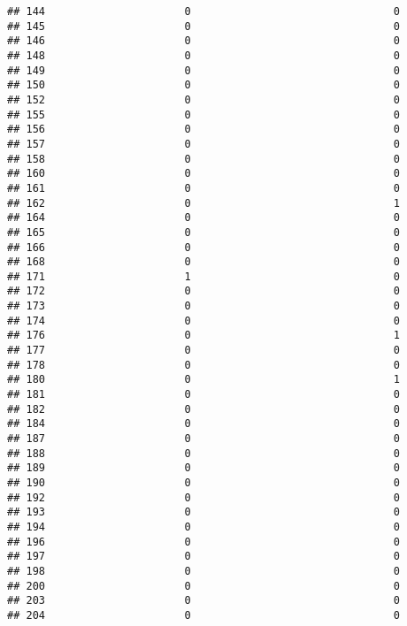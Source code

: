 \documentclass[
]{article}
\begin{document}
\begin{verbatim}
## 144                      0                                0
## 145                      0                                0
## 146                      0                                0
## 148                      0                                0
## 149                      0                                0
## 150                      0                                0
## 152                      0                                0
## 155                      0                                0
## 156                      0                                0
## 157                      0                                0
## 158                      0                                0
## 160                      0                                0
## 161                      0                                0
## 162                      0                                1
## 164                      0                                0
## 165                      0                                0
## 166                      0                                0
## 168                      0                                0
## 171                      1                                0
## 172                      0                                0
## 173                      0                                0
## 174                      0                                0
## 176                      0                                1
## 177                      0                                0
## 178                      0                                0
## 180                      0                                1
## 181                      0                                0
## 182                      0                                0
## 184                      0                                0
## 187                      0                                0
## 188                      0                                0
## 189                      0                                0
## 190                      0                                0
## 192                      0                                0
## 193                      0                                0
## 194                      0                                0
## 196                      0                                0
## 197                      0                                0
## 198                      0                                0
## 200                      0                                0
## 203                      0                                0
## 204                      0                                0

\end{verbatim}
\end{document}

